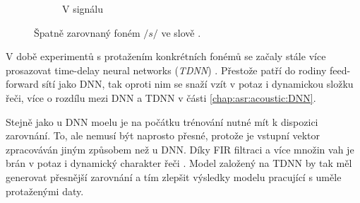 \begin{figure}[htpb]
\begin{subfigure}[b]{0.55\textwidth}
    \caption{V signálu}
    \label{fig:realisation:augmentation:alignemnt:wrong:audio}
  \end{subfigure}
  \caption{Špatně zarovnaný foném $/s/$ ve slově .}
  \label{fig:realisation:augmentation:alignemnt:wrong}
\end{figure}


V době experimentů s protažením konkrétních fonémů se začaly stále více prosazovat time-delay neural networks (\textit{TDNN}) . Přestože patří do rodiny feed-forward sítí jako DNN, tak oproti nim se snaží vzít v potaz i dynamickou složku řeči, více o rozdílu mezi DNN a TDNN v části \ref{chap:asr:acoustic:DNN}.



Stejně jako u DNN moelu je na počátku trénování nutné mít k dispozici zarovnání. To, ale nemusí být naprosto přesné, protože je vstupní vektor zpracováván jiným způsobem než u DNN. Díky FIR filtraci a více množin vah je brán v potaz i dynamický charakter řeči \cite{Peddinti2015}. Model založený na TDNN by tak měl generovat přesnější zarovnání a tím zlepšit výsledky modelu pracující s uměle protaženými daty.

